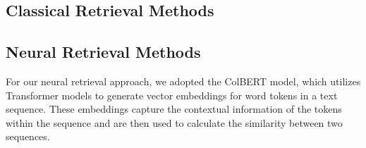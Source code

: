 \documentclass[11pt]{article}
\begin{document}
\subsection{Classical Retrieval Methods}

\subsection{Neural Retrieval Methods}
For our neural retrieval approach, we adopted the ColBERT \cite{khattab2020ColBERT} model, which utilizes Transformer models to generate vector embeddings for word tokens in a text sequence. These embeddings capture the contextual information of the tokens within the sequence and are then used to calculate the similarity between two sequences.
\end{document}
